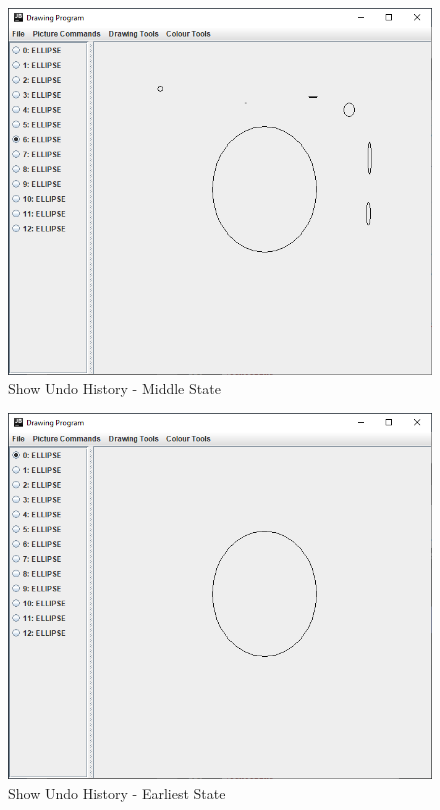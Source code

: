 \documentclass[12pt]{article} %
\begin{document}
\begin{figure}[H]
\caption{Show Undo History - Middle State}
\centering
\includegraphics[scale=0.75]{pictures/showUndoSecondWindow.PNG}
\end{figure}

\begin{figure}[H]
\caption{Show Undo History - Earliest State}
\centering
\includegraphics[scale=0.75]{pictures/showUndoThirdWindow.PNG}
\end{figure}
\end{document}
